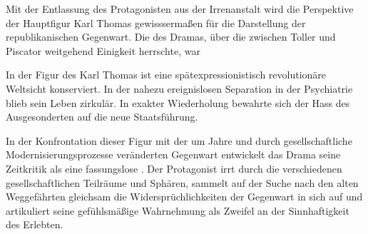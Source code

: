 
Mit der Entlassung des Protagonisten aus der Irrenanstalt wird die Perspektive
der Hauptfigur Karl Thomas gewisssermaßen  für die
Darstellung der republikanischen Gegenwart.
Die \Cite{Grundidee} des Dramas,
über die zwischen Toller und Piscator weitgehend Einigkeit herrschte, war
\Cite{der Zusammenprall eines Revolutionärs, der acht Jahre im Irrenhaus
  zugebracht hatte, mit der Welt von 1927.}

In der Figur des Karl Thomas ist eine spätexpressionistisch revolutionäre
Weltsicht konserviert. In der nahezu ereignislosen Separation in der
Psychiatrie blieb sein Leben zirkulär. In exakter Wiederholung bewahrte sich
der Hass des Ausgesonderten auf die  neue
Staatsführung.

In der Konfrontation dieser Figur mit der um Jahre  und
durch gesellschaftliche Modernisierungsprozesse veränderten Gegenwart
entwickelt das Drama seine Zeitkritik als eine fassungslose 
. Der Protagonist irrt durch die verschiedenen
gesellschaftlichen Teilräume und Sphären, sammelt auf der Suche nach den alten
Weggefährten gleichsam die Widersprüchlichkeiten der Gegenwart in sich auf und
artikuliert seine gefühlsmäßige Wahrnehmung als Zweifel an der Sinnhaftigkeit
des Erlebten.

